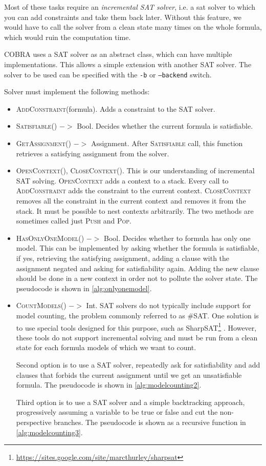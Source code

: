 Most of these tasks require an \emph{incremental SAT solver}, i.e. a
  sat solver to which you can add constraints and take them back later.
Without this feature, we would have to call the solver from a clean state
  many times on the whole formula, which would ruin the computation time.

COBRA uses a SAT solver as an abstract class, which can have multiple implementations.
This allows a simple extension with another SAT solver.
The solver to be used can be specified with
  the \texttt{-b} or \texttt{--backend} switch.

Solver must implement the following methods:
\begin{itemize}
\item \textsc{AddConstraint}(formula). Adds a constraint to the SAT solver.
\item \textsc{Satisfiable()} $->$ Bool. Decides whether the current formula is satisfiable.
\item \textsc{GetAssignment()} $->$ Assignment.
  After \textsc{Satisfiable} call, this function retrieves
  a satisfying assignment from the solver.
\item \textsc{OpenContext(), CloseContext()}.
  This is our understanding of incremental SAT solving.
  \textsc{OpenContext} adds a context to a stack.
  Every call to \textsc{AddConstraint} adds the constraint to the current context.
  \textsc{CloseContext} removes all the constraint in the current context and removes it
  from the stack. It must be possible to nest contexts arbitrarily.
  The two methods are sometimes called just \textsc{Push} and \textsc{Pop}.
\item \textsc{HasOnlyOneModel()} $->$ Bool. Decides whether to formula has only one model.
  This can be implemented by asking whether the formula is satisfiable,
  if yes, retrieving the satisfying assignment, adding
  a clause with the assignment negated and asking for satisfiability again.
  Adding the new clause should be done in a new context in order not to pollute
  the solver state. The pseudocode is shown in \autoref{alg:onlyonemodel}.

\item \textsc{CountModels()} $->$ Int.
SAT solvers do not typically include support for model counting, the problem
  commonly referred to as \#SAT.
One solution is to use
  special tools designed for this purpose,
  such as SharpSAT\footnote{\url{https://sites.google.com/site/marcthurley/sharpsat}}
  \cite{sharpsat}.
However, these tools do not support incremental solving and
  must be run from a clean state for each formula models of which we want to count.

Second option is to use a SAT solver, repeatedly ask for satisfiability and
  add clauses that forbids the current assignment until we get
  an unsatisfiable formula. The pseudocode is shown in \autoref{alg:modelcounting2}.

Third option is to use a SAT solver and a simple backtracking approach,
  progressively assuming a variable to be true or false and cut the non-perspective
  branches.
The pseudocode is shown as a recursive function in \autoref{alg:modelcounting3}.
\end{itemize}

